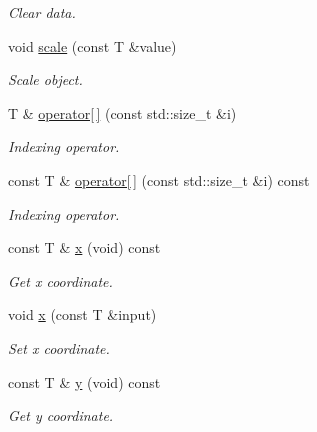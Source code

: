 \begin{DoxyCompactItemize}
\begin{DoxyCompactList}\small\item\em Clear data. \end{DoxyCompactList}\item 
void \hyperlink{classddd_1_1row_object_a6c87f5fadb3b725f6c52cb08aed98eb2}{scale} (const T \&value)
\begin{DoxyCompactList}\small\item\em Scale object. \end{DoxyCompactList}\item 
T \& \hyperlink{classddd_1_1row_object_aff4fdb32f8b837e224b26de2bcecc7d2}{operator\mbox{[}$\,$\mbox{]}} (const std\+::size\+\_\+t \&i)
\begin{DoxyCompactList}\small\item\em Indexing operator. \end{DoxyCompactList}\item 
const T \& \hyperlink{classddd_1_1row_object_a60418f8af09e6913d16b48f2cb53e826}{operator\mbox{[}$\,$\mbox{]}} (const std\+::size\+\_\+t \&i) const
\begin{DoxyCompactList}\small\item\em Indexing operator. \end{DoxyCompactList}\item 
\mbox{\label{classddd_1_1row_object_a29439db5bbde399481c341cb66b7973e}} 
const T \& \hyperlink{classddd_1_1row_object_a29439db5bbde399481c341cb66b7973e}{x} (void) const
\begin{DoxyCompactList}\small\item\em Get x coordinate. \end{DoxyCompactList}\item 
void \hyperlink{classddd_1_1row_object_afe92fca2bf490cdef9b684bd3847d7eb}{x} (const T \&input)
\begin{DoxyCompactList}\small\item\em Set x coordinate. \end{DoxyCompactList}\item 
\mbox{\label{classddd_1_1row_object_adac0d72ea44ad43b82f47b7a26010e4e}} 
const T \& \hyperlink{classddd_1_1row_object_adac0d72ea44ad43b82f47b7a26010e4e}{y} (void) const
\begin{DoxyCompactList}\small\item\em Get y coordinate. \end{DoxyCompactList}\item 

\end{DoxyCompactItemize}
